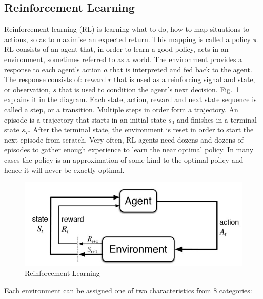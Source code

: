 \subsection{Reinforcement Learning} \label{Sec.RL}

Reinforcement learning (RL) is learning what to do, how to map situations to actions, so as to maximise an expected return. \cite{Book.RLAI} This mapping is called a policy $\pi$. RL consists of an agent that, in order to learn a good policy, acts in an environment, sometimes referred to as a world. The environment provides a response to each agent's action $a$ that is interpreted and fed back to the agent. The response consists of: reward $r$ that is used as a reinforcing signal and state, or observation, $s$ that is used to condition the agent's next decision. Fig.~\ref{Fig.RL} explains it in the diagram.
Each state, action, reward and next state sequence is called a step, or a transition. Multiple steps in order form a trajectory. An episode is a trajectory that starts in an initial state $s_0$ and finishes in a terminal state $s_T$. After the terminal state, the environment is reset in order to start the next episode from scratch. Very often, RL agents need dozens and dozens of episodes to gather enough experience to learn the near optimal policy. In many cases the policy is an approximation of some kind to the optimal policy and hence it will never be exactly optimal.

\begin{figure}[H]
\includegraphics[]{figures/RL.jpg}
\caption[Reinforcement Learning]{Reinforcement Learning \protect\cite{Book.RLAI}}
\label{Fig.RL}
\end{figure}

Each environment can be assigned one of two characteristics from 8 categories:

